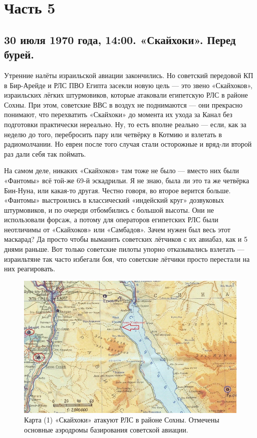 \chapter{Часть 5}
\section{30 июля 1970 года, 14:00. «Скайхоки». Перед бурей.}

Утренние налёты израильской авиации закончились. Но советский передовой КП в Бир-Арейде и РЛС ПВО Египта засекли новую цель — это звено «Скайхоков», израильских лёгких штурмовиков, которые атаковали египетскую РЛС в районе Сохны. При этом, советские ВВС в воздух не поднимаются — они прекрасно понимают, что перехватить «Скайхоки» до момента их ухода за Канал без подготовки практически нереально. Ну, то есть вполне реально — если, как за неделю до того, перебросить пару или четвёрку в Котмию и взлетать в радиомолчании. Но евреи после того случая стали осторожные и вряд-ли второй раз дали себя так поймать.

На самом деле, никаких «Скайхоков» там тоже не было — вместо них были «Фантомы» всё той-же 69-й эскадрильи. Я не знаю, была ли это та же четвёрка Бин-Нуна, или какая-то другая. Честно говоря, во второе верится больше. «Фантомы» выстроились в классический «индейский круг» дозвуковых штурмовиков, и по очереди отбомбились с большой высоты. Они не использовали форсаж, а потому для операторов египетских РЛС были неотличимы от «Скайхоков» или «Самбадов». Зачем нужен был весь этот маскарад? Да просто чтобы выманить советских лётчиков с их авиабаз, как и 5 днями раньше. Вот только советские пилоты упорно отказывались взлетать — израильтяне так часто избегали боя, что советские лётчики просто перестали на них реагировать.

\begin{figure}[h!tb] 
	\centering\includegraphics[scale=0.4]{Dolina_5/ZfWbBYQ2d98.jpg}
	\caption{
		Карта (1) «Скайхоки» атакуют РЛС в районе Сохны. Отмечены основные аэродромы базирования советской авиации.}%
\end{figure}

